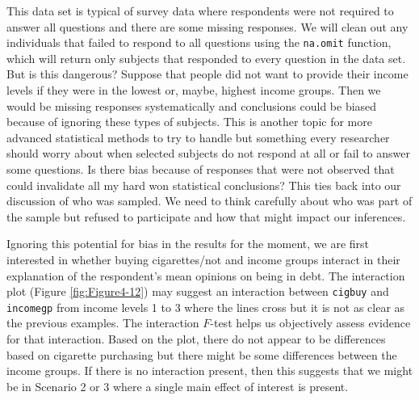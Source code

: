 \documentclass[]{book}
\newenvironment{Shaded}{\begin{snugshade}}{\end{snugshade}}
\newcommand{\KeywordTok}[1]{\textcolor[rgb]{0.13,0.29,0.53}{\textbf{#1}}}
\newcommand{\StringTok}[1]{\textcolor[rgb]{0.31,0.60,0.02}{#1}}
\newcommand{\OperatorTok}[1]{\textcolor[rgb]{0.81,0.36,0.00}{\textbf{#1}}}
\newcommand{\NormalTok}[1]{#1}
\theoremstyle{definition}
\theoremstyle{definition}
\theoremstyle{remark}
\begin{document}
This data set is typical of survey data where respondents were not
required to answer all questions and there are some missing responses.
We will clean out any individuals that failed to respond to all
questions using the \texttt{na.omit} function, which will return only
subjects that responded to every question in the data set. But is this
dangerous? Suppose that people did not want to provide their income
levels if they were in the lowest or, maybe, highest income groups. Then
we would be missing responses systematically and conclusions could be
biased because of ignoring these types of subjects. This is another
topic for more advanced statistical methods to try to handle but
something every researcher should worry about when selected subjects do
not respond at all or fail to answer some questions. Is there bias
because of responses that were not observed that could invalidate all my
hard won statistical conclusions? This ties back into our discussion of
who was sampled. We need to think carefully about who was part of the
sample but refused to participate and how that might impact our
inferences.

Ignoring this potential for bias in the results for the moment, we are
first interested in whether buying cigarettes/not and income groups
interact in their explanation of the respondent's mean opinions on being
in debt. The interaction plot (Figure \ref{fig:Figure4-12}) may suggest
an interaction between \texttt{cigbuy} and \texttt{incomegp} from income
levels 1 to 3 where the lines cross but it is not as clear as the
previous examples. The interaction \(F\)-test helps us objectively
assess evidence for that interaction. Based on the plot, there do not
appear to be differences based on cigarette purchasing but there might
be some differences between the income groups. If there is no
interaction present, then this suggests that we might be in Scenario 2
or 3 where a single main effect of interest is present.

\begin{Shaded}
\end{Shaded}
\end{document}
